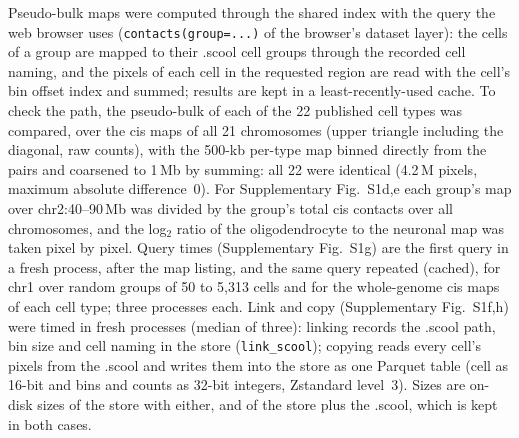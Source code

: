 \documentclass[11pt]{article}
\newcommand{\pkg}[1]{\texttt{#1}}
\begin{document}
Pseudo-bulk maps were computed through the shared index with the query the web browser uses (\pkg{contacts(group=...)} of the browser's dataset layer): the cells of a group are mapped to their .scool cell groups through the recorded cell naming, and the pixels of each cell in the requested region are read with the cell's bin offset index and summed; results are kept in a least-recently-used cache.
To check the path, the pseudo-bulk of each of the 22 published cell types was compared, over the cis maps of all 21 chromosomes (upper triangle including the diagonal, raw counts), with the 500-kb per-type map binned directly from the pairs and coarsened to 1\,Mb by summing: all 22 were identical (4.2\,M pixels, maximum absolute difference~0).
For Supplementary Fig.~S1d,e each group's map over chr2:40--90\,Mb was divided by the group's total cis contacts over all chromosomes, and the log$_2$ ratio of the oligodendrocyte to the neuronal map was taken pixel by pixel.
Query times (Supplementary Fig.~S1g) are the first query in a fresh process, after the map listing, and the same query repeated (cached), for chr1 over random groups of 50 to 5,313 cells and for the whole-genome cis maps of each cell type; three processes each.
Link and copy (Supplementary Fig.~S1f,h) were timed in fresh processes (median of three): linking records the .scool path, bin size and cell naming in the store (\pkg{link\_scool}); copying reads every cell's pixels from the .scool and writes them into the store as one Parquet table (cell as 16-bit and bins and counts as 32-bit integers, Zstandard level~3).
Sizes are on-disk sizes of the store with either, and of the store plus the .scool, which is kept in both cases.
\end{document}

